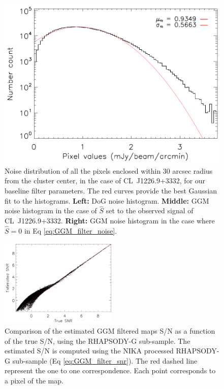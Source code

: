 \documentclass[traditabstract]{aa}
\begin{document}
\begin{figure}[h]
\includegraphics[trim=0cm 0cm 0cm 0cm, clip=true, totalheight=4.4cm]{Figure/GGM_noise_stat_CLJ1227_NoSignal.pdf}
\caption{\footnotesize{Noise distribution of all the pixels enclosed within 30 arcsec radius from the cluster center, in the case of \mbox{CL~J1226.9+3332}, for our baseline filter parameters. The red curves provide the best Gaussian fit to the histograms. {\bf Left:} DoG noise histogram. {\bf Middle:} GGM noise histogram in the case of $\hat{S}$ set to the observed signal of \mbox{CL~J1226.9+3332}. {\bf Right:} GGM noise histogram in the case where $\hat{S} = 0$ in Eq \ref{eq:GGM_filter_noise}.}}
\label{fig:noise_statistics1}
\end{figure}

\begin{figure}[h]
\centering
\includegraphics[width=0.5\textwidth]{Figure/Conta_noise_Grad_SNRtrueVSmeasRG377_00181_Ymap_zobs0p5_15_15_45.pdf}
\caption{\footnotesize{Comparison of the estimated GGM filtered maps S/N as a function of the true S/N, using the RHAPSODY-G sub-sample. The estimated S/N is computed using the NIKA processed RHAPSODY-G sub-sample (Eq \ref{eq:GGM_filter_snr}). The red dashed line represent the one to one correspondence. Each point corresponds to a pixel of the map.}}
\label{fig:noise_statistics2}
\end{figure}
\end{document}
